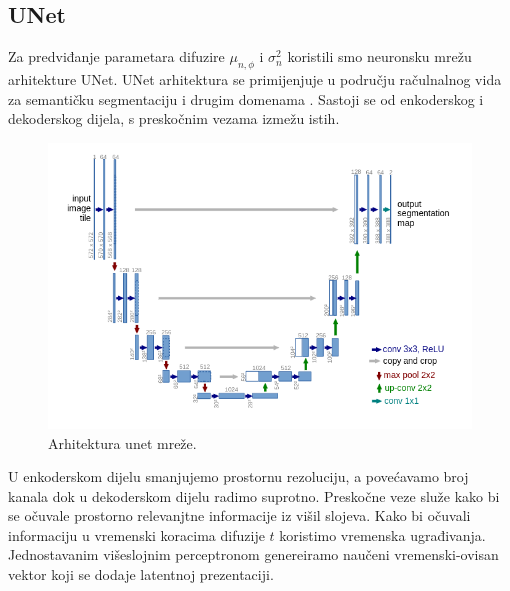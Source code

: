\documentclass[10pt, a4paper, croatian]{article}
\begin{document}
\subsection{UNet}
Za predviđanje parametara difuzire $\mu_{n,\phi}$ i $\sigma^2_n$ koristili smo neuronsku mrežu arhitekture UNet.
UNet arhitektura se primijenjuje u području račulnalnog vida za semantičku segmentaciju i drugim domenama \cite{unet}.
Sastoji se od enkoderskog i dekoderskog dijela, s preskočnim vezama izmežu istih.
\begin{figure}
	\begin{center}
	\includegraphics[width=\columnwidth]{images/unet.png}
	\caption{Arhitektura unet mreže. \cite{unet}}
	\label{fig:figure1}
	\end{center}
\end{figure}
U enkoderskom dijelu smanjujemo prostornu rezoluciju, a povećavamo broj kanala dok u dekoderskom dijelu radimo suprotno. 
Preskočne veze služe kako bi se očuvale prostorno relevanjtne informacije iz višil slojeva.
Kako bi očuvali informaciju u vremenski koracima difuzije $t$ koristimo vremenska ugrađivanja.
Jednostavanim višeslojnim perceptronom genereiramo naučeni vremenski-ovisan vektor koji se dodaje latentnoj prezentaciji.
\end{document}
